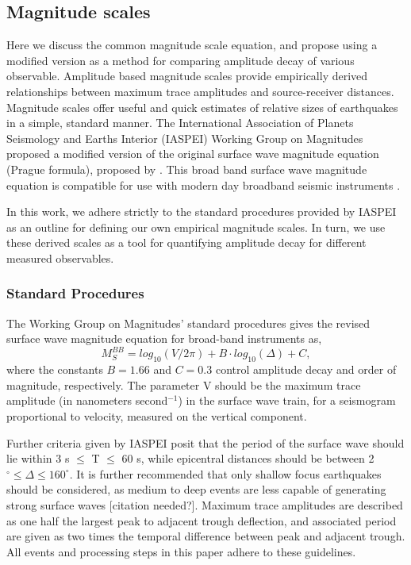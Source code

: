 \documentclass{gji}
\begin{document}
\subsection{Magnitude scales}
Here we discuss the common magnitude scale equation, and propose using a modified version as a method for comparing amplitude decay of various observable. Amplitude based magnitude scales provide empirically derived relationships between maximum trace amplitudes and source-receiver distances. Magnitude scales offer useful and quick estimates of relative sizes of earthquakes in a simple, standard  manner. 
The International Association of Planets Seismology and Earths Interior (IASPEI) Working Group on Magnitudes proposed a modified version of the original surface wave magnitude equation (Prague formula), proposed by \cite{karnik1962standardization}.
This broad band surface wave magnitude equation is compatible for use with modern day broadband seismic instruments \cite{bormann2000new}.

In this work, we adhere strictly to the standard procedures provided by IASPEI as an outline for defining our own empirical magnitude scales. In turn, we use these derived scales as a tool for quantifying amplitude decay for different measured observables.

\subsubsection{Standard Procedures}\label{standproc}
The Working Group on Magnitudes' standard procedures gives the revised surface wave magnitude equation for broad-band instruments as,
\begin{equation}\label{eq:mag}
	M_S^{BB} = log_{10}(V/2\pi) + B\cdot log_{10}(\Delta) + C, 
\end{equation}
where the constants $B=1.66$ and $C=0.3$ control amplitude decay and order of magnitude, respectively. The parameter V should be the maximum trace amplitude (in nanometers second$^{-1}$) in the surface wave train, for a seismogram proportional to velocity, measured on the vertical component. 

Further criteria given by IASPEI posit that the period of the surface wave should lie within 3 s $\le$ T $\le$ 60 s, while epicentral distances should be between 2$^\circ \le \Delta \le 160^\circ$. It is further recommended that only shallow focus earthquakes should be considered, as medium to deep events are less capable of generating strong surface waves [citation needed?].
Maximum trace amplitudes are described as one half the largest peak to adjacent trough deflection, and associated period are given as two times the temporal difference between peak and adjacent trough. All events and processing steps in this paper adhere to these guidelines.
\end{document}

